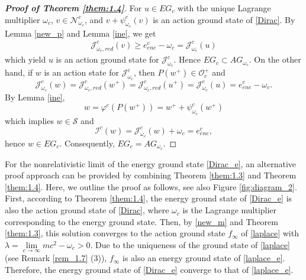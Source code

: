 \documentclass{amsart}
\theoremstyle{plain}
\theoremstyle{definition}
\theoremstyle{remark}
\numberwithin{equation}{section} \numberwithin{figure}{section}
\begin{document}
\begin{proof}[\textbf{Proof of Theorem \ref{them:1.4}}]
For $u\in EG_c$ with the unique Lagrange multiplier $\omega_c $,  
$v\in \mathcal{N}_{\omega_c}^c$, and $v+\psi_{\omega_c}^c(v)$ is an action ground state of \eqref{Dirac}. By Lemma \ref{new_p} and Lemma \ref{ine},
we get
  \begin{equation}\label{eq_111}
  \begin{split}
       \mathcal{J}^c_{\omega_c,red}(v)\geq e_{ene}^c-\omega_c= \mathcal{J}_{\omega_c}^c(u)
  \end{split}
  \end{equation}
  which yield $u$ is an action ground state for $\mathcal{J}_{\omega_c}^c$. Hence 
  $
  EG_c\subset AG_{\omega_c}.
  $
On the other hand, if $w$ is an action state for $\mathcal{J}_{\omega_c}^c$, then $P(w^+)\in \mathcal{O}_c^+$ and
$$
\mathcal{J}_{\omega_c}^c(w)=\mathcal{J}^c_{\omega_c,red}(w^+)=\mathcal{J}^c_{\omega_c,red}(u^+)=\mathcal{J}_{\omega_c}^c(u)=e_{ene}^c-\omega_c.
$$
By Lemma \ref{ine},
$$
w=\varphi^c(P(w^+))=w^+ + \psi_{\omega_c}^c(w^+)
$$
which implies $w\in \mathcal{S}$ and
$$
\mathcal{I}^c(w)=\mathcal{J}_{\omega_c}^c(w)+ \omega_c=e_{ene}^c,
$$
hence $w\in EG_c$. Consequently, $EG_c= AG_{\omega_c}$.
\end{proof}

  For the nonrelativistic limit of the energy ground state \eqref{Dirac_e}, 
  an alternative proof approach can
   be provided by combining Theorem \ref{them:1.3} and Theorem \ref{them:1.4}.
   Here, we outline the proof as follows, see also Figure \ref{fig:diagram_2}. First, according to Theorem \ref{them:1.4}, 
   the energy ground state of \eqref{Dirac_e} is also the action ground state 
   of \eqref{Dirac}, where \( \omega_c \) is the Lagrange multiplier corresponding
    to the energy ground state. Then, by \eqref{new_m} and Theorem \ref{them:1.3}, this solution
     converges to the action ground state \( f_\infty \) of \eqref{laplace} with \(  \lambda=\lim\limits_{c\to\infty}mc^2- \omega_c >0 \). 
     Due to the uniqueness of the ground state of \eqref{laplace} (see Remark \ref{rem_1.7} (3)), \( f _\infty\) is also an energy ground state of
       \eqref{laplace_e}. Therefore, the energy ground state of \eqref{Dirac_e}  converge to that of \eqref{laplace_e}.
\end{document}
